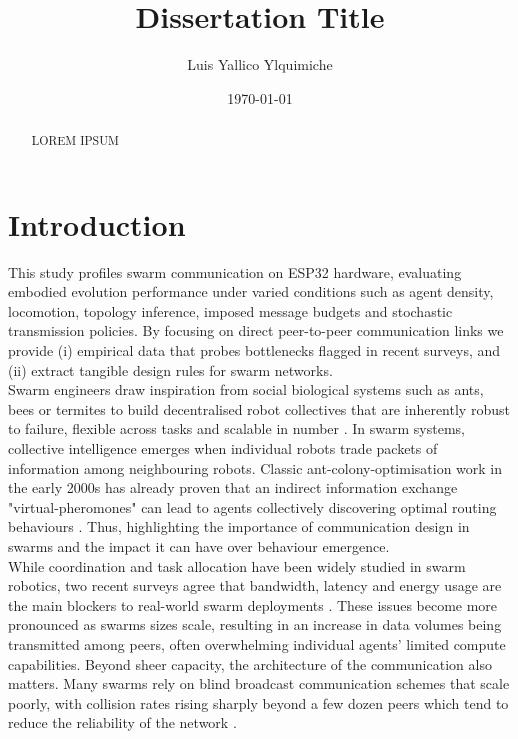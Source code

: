 \documentclass[conference]{IEEEtran}
\title{Dissertation Title}
\author{Luis Yallico Ylquimiche}
\date{\today}
\begin{document}
\maketitle

\begin{abstract}
LOREM IPSUM
\end{abstract}


\section{Introduction}

This study profiles swarm communication on ESP32 hardware, evaluating embodied evolution performance under varied conditions such as agent density, locomotion, topology inference, imposed message budgets and stochastic transmission policies. By focusing on direct peer-to-peer communication links we provide (i) empirical data that probes bottlenecks flagged in recent surveys, and (ii) extract tangible design rules for swarm networks.\\

Swarm engineers draw inspiration from social biological systems such as ants, bees or termites to build decentralised robot collectives that are inherently robust to failure, flexible across tasks and scalable in number \cite{hamann_swarm_2018}. In swarm systems, collective intelligence emerges when individual robots trade packets of information among neighbouring robots. Classic ant-colony-optimisation work in the early 2000s has already proven that an indirect information exchange "virtual-pheromones" can lead to agents collectively discovering optimal routing behaviours \cite{dorigo_ant_2000}. Thus, highlighting the importance of communication design in swarms and the impact it can have over behaviour emergence.\\

While coordination and task allocation have been widely studied in swarm robotics, two recent surveys agree that bandwidth, latency and energy usage are the main blockers to real-world swarm deployments \cite{ding_advancements_2023}\cite{an_multi-robot_2023}. These issues become more pronounced as swarms sizes scale, resulting in an increase in data volumes being transmitted among peers, often overwhelming individual agents' limited compute capabilities. Beyond sheer capacity, the architecture of the communication also matters. Many swarms rely on blind broadcast communication schemes that scale poorly, with collision rates rising sharply beyond a few dozen peers which tend to reduce the reliability of the network \cite{an_multi-robot_2023}.\\
\end{document}

